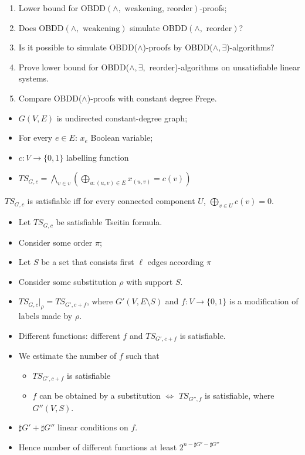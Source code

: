 {
\begin{enumerate}
\item Lower bound for OBDD$(\land, \mbox{ weakening, reorder})$-proofs;
\item Does OBDD$(\land, \mbox{ weakening})$ simulate OBDD$(\land, \mbox{ reorder})$?
\item Is it possible to simulate OBDD($\land$)-proofs by OBDD($\land, \exists$)-algorithms?
\item Prove lower bound for OBDD($\land, \exists$,\mbox{ reorder})-algorithms on unsatisfiable linear systems.
\item Compare OBDD($\land$)-proofs with constant degree Frege.
\end{enumerate}
}

%

{
\begin{itemize}
\item $G(V,E)$ is undirected constant-degree graph;
\item For every $e\in E$: $x_e$ Boolean variable;
\item $c:V\to \{0,1\}$ labelling function
\item $TS_{G,c}=\bigwedge_{v\in v} \left( \bigoplus_{u: (u,v)\in E} x_{(u,v)} = c(v)\right)$
\end{itemize}

\mylem $TS_{G,c}$ is satisfiable iff for every connected component $U$, $\bigoplus_{v\in U} c(v)=0$.
}

{

\begin{itemize}
\item Let $TS_{G,c}$ be satisfiable Tseitin formula.
\item Consider some order $\pi$;
\item Let $S$ be a set that consists first $\ell$ edges according $\pi$
\item Consider some substitution $\rho$ with support $S$.
\item $TS_{G,c}|_\rho=TS_{G',c+f}$, where $G'(V, E\setminus S)$ and $f:V\to \{0,1\}$ is a modification of labels made by $\rho$.
\item Different functions: different $f$ and $TS_{G',c+f}$ is satisfiable.
\item We estimate the number of $f$ such that
\begin{itemize}
\item $TS_{G',c+f}$ is satisfiable
\item $f$ can be obtained by a substitution \pause $\iff$ $TS_{G'',f}$ is satisfiable, where $G''(V, S)$.
\end{itemize}
\item  $\sharp G'+\sharp G''$ linear conditions on $f$.
\item Hence number of different functions at least $2^{n-\sharp G'-\sharp G''}$
\end{itemize}
}

